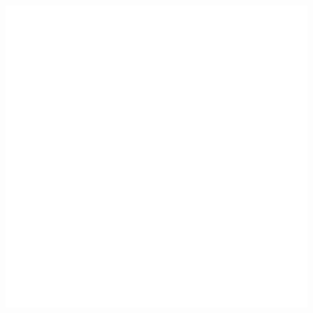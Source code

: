 \begin{figure}[!htbp]
 \begin{center}
  \includegraphics[clip=true, keepaspectratio, width=120mm]{images/ishitani.eps}
 \end{center}
\caption[]{}
\label{fig.ishitani}
\end{figure}






